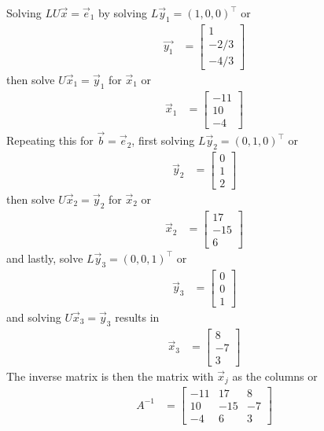 \begin{example}
Solving $LU\vec{x} = \vec{e}_1$ by  solving $L\vec{y}_1 = (1,0,0)^{\intercal}$ or
\begin{align*}
\vec{y_1} & = \begin{bmatrix}
1 \\ -2/3 \\ -4/3
\end{bmatrix}
\end{align*}
then solve $U\vec{x}_1 = \vec{y}_1$ for $\vec{x}_1$ or
\begin{align*}
\vec{x}_1 & = \begin{bmatrix}
-11 \\ 10 \\ -4
\end{bmatrix}
\end{align*}
Repeating this for $\vec{b}=\vec{e}_2$, first solving $L\vec{y}_2 = (0,1,0)^{\intercal}$ or
\begin{align*}
\vec{y}_2 & = \begin{bmatrix}
0 \\ 1 \\ 2 
\end{bmatrix}
\end{align*}
then solve $U\vec{x}_2  = \vec{y}_2$ for $\vec{x}_2$ or
\begin{align*}
\vec{x}_2 & = \begin{bmatrix}
17 \\ -15 \\ 6
\end{bmatrix}
\end{align*}
and lastly, solve $L\vec{y}_3 = (0,0,1)^{\intercal}$ or 
\begin{align*}
\vec{y}_3 & = \begin{bmatrix}
0 \\ 0 \\ 1
\end{bmatrix} 
\end{align*}
and solving $U\vec{x}_3 = \vec{y}_3$ results in
\begin{align*}
\vec{x}_3 & = \begin{bmatrix}
8 \\ -7 \\ 3
\end{bmatrix}
\end{align*}
The inverse matrix is then the matrix with $\vec{x}_j$ as the columns or 
\begin{align*}
A^{-1} & = \begin{bmatrix}
-11 & 17 & 8 \\
10 & -15 & -7 \\
-4 & 6 & 3 
\end{bmatrix}
\end{align*}
\end{example}

